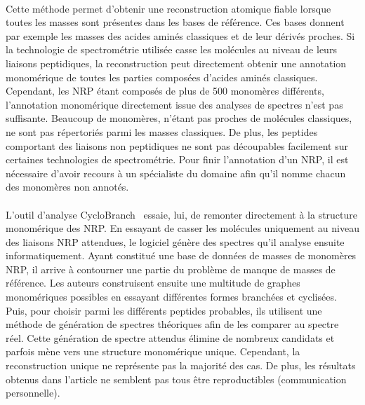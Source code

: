 \documentclass[12pt,french,twoside]{report}
\begin{document}
\paragraph{}Cette méthode permet d'obtenir une reconstruction atomique fiable lorsque toutes les masses sont présentes dans les bases de référence.
Ces bases donnent par exemple les masses des acides aminés classiques et de leur dérivés proches.
Si la technologie de spectrométrie utilisée casse les molécules au niveau de leurs liaisons peptidiques, la reconstruction peut directement obtenir une annotation monomérique de toutes les parties composées d'acides aminés classiques.
Cependant, les NRP étant composés de plus de 500 monomères différents, l'annotation monomérique directement issue des analyses de spectres n'est pas suffisante.
Beaucoup de monomères, n'étant pas proches de molécules classiques, ne sont pas répertoriés parmi les masses classiques.
De plus, les peptides comportant des liaisons non peptidiques ne sont pas découpables facilement sur certaines technologies de spectrométrie.
Pour finir l'annotation d'un NRP, il est nécessaire d'avoir recours à un spécialiste du domaine afin qu'il nomme chacun des monomères non annotés.

\paragraph{}L'outil d'analyse CycloBranch~\cite{novak_cyclobranch:_2015} essaie, lui, de remonter directement à la structure monomérique des NRP.
En essayant de casser les molécules uniquement au niveau des liaisons NRP attendues, le logiciel génère des spectres qu'il analyse ensuite informatiquement.
Ayant constitué une base de données de masses de monomères NRP, il arrive à contourner une partie du problème de manque de masses de référence.
Les auteurs construisent ensuite une multitude de graphes monomériques possibles en essayant différentes formes branchées et cyclisées.
Puis, pour choisir parmi les différents peptides probables, ils utilisent une méthode de génération de spectres théoriques afin de les comparer au spectre réel.
Cette génération de spectre attendus élimine de nombreux candidats et parfois mène vers une structure monomérique unique.
Cependant, la reconstruction unique ne représente pas la majorité des cas.
De plus, les résultats obtenus dans l'article ne semblent pas tous être reproductibles (communication personnelle).
\end{document}
